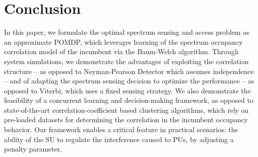 \documentclass[10pt,twocolumn]{IEEEtran}
\begin{document}
\section{Conclusion}\label{V}
In this paper, we formulate the optimal spectrum sensing and access problem as an approximate POMDP, which leverages learning of the spectrum occupancy correlation model of the incumbent via the Baum-Welch algorithm. Through system simulations, we demonstrate the advantages of exploiting the correlation structure -- as opposed to Neyman-Pearson Detector which assumes independence -- and of adapting the spectrum sensing decision to optimize the performance -- as opposed to Viterbi, which uses a fixed sensing strategy. We also demonstrate the feasibility of a concurrent learning and decision-making framework, as opposed to state-of-the-art correlation-coefficient based clustering algorithms, which rely on pre-loaded datasets for determining the correlation in the incumbent occupancy behavior. Our framework enables a critical feature in practical scenarios: the ability of the SU to regulate the interference caused to PUs, by adjusting a penalty parameter.
\vspace{-4mm}


\end{document}
